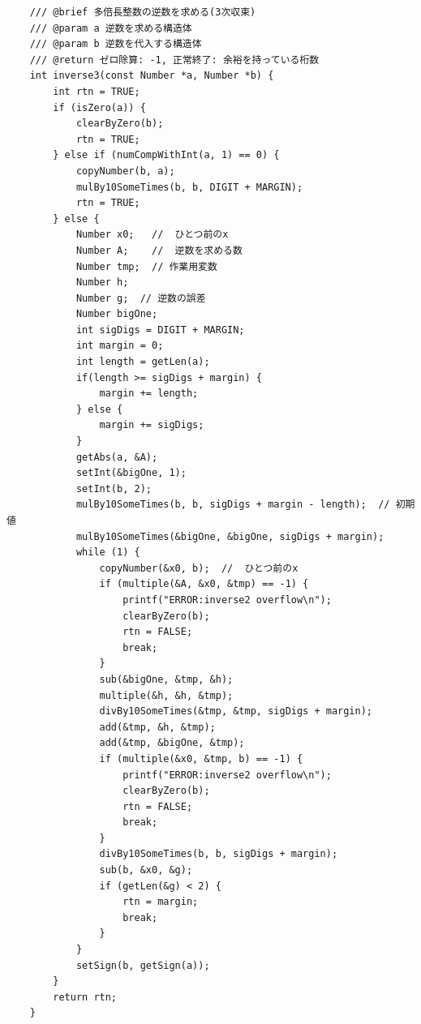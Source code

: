 \documentclass[a4paper,11pt,dvipdfmx]{jsarticle}
\begin{document}
\begin{lstlisting}
    /// @brief 多倍長整数の逆数を求める(3次収束)
    /// @param a 逆数を求める構造体
    /// @param b 逆数を代入する構造体
    /// @return ゼロ除算: -1, 正常終了: 余裕を持っている桁数
    int inverse3(const Number *a, Number *b) {
        int rtn = TRUE;
        if (isZero(a)) {
            clearByZero(b);
            rtn = TRUE;
        } else if (numCompWithInt(a, 1) == 0) {
            copyNumber(b, a);
            mulBy10SomeTimes(b, b, DIGIT + MARGIN);
            rtn = TRUE;
        } else {
            Number x0;   //  ひとつ前のx
            Number A;    //  逆数を求める数
            Number tmp;  // 作業用変数
            Number h;
            Number g;  // 逆数の誤差
            Number bigOne;
            int sigDigs = DIGIT + MARGIN;
            int margin = 0;
            int length = getLen(a);
            if(length >= sigDigs + margin) {
                margin += length;
            } else {
                margin += sigDigs;
            }
            getAbs(a, &A);
            setInt(&bigOne, 1);
            setInt(b, 2);
            mulBy10SomeTimes(b, b, sigDigs + margin - length);  // 初期値
            mulBy10SomeTimes(&bigOne, &bigOne, sigDigs + margin);
            while (1) {
                copyNumber(&x0, b);  //  ひとつ前のx
                if (multiple(&A, &x0, &tmp) == -1) {
                    printf("ERROR:inverse2 overflow\n");
                    clearByZero(b);
                    rtn = FALSE;
                    break;
                }
                sub(&bigOne, &tmp, &h);
                multiple(&h, &h, &tmp);
                divBy10SomeTimes(&tmp, &tmp, sigDigs + margin);
                add(&tmp, &h, &tmp);
                add(&tmp, &bigOne, &tmp);
                if (multiple(&x0, &tmp, b) == -1) {
                    printf("ERROR:inverse2 overflow\n");
                    clearByZero(b);
                    rtn = FALSE;
                    break;
                }
                divBy10SomeTimes(b, b, sigDigs + margin);
                sub(b, &x0, &g);
                if (getLen(&g) < 2) {
                    rtn = margin;
                    break;
                }
            }
            setSign(b, getSign(a));
        }
        return rtn;
    }
    

\end{lstlisting}
\end{document}
